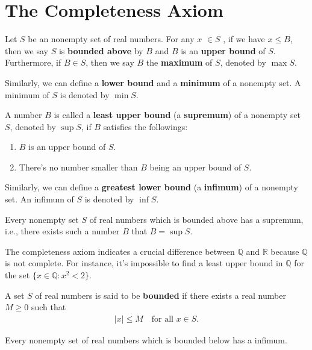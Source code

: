 	\section{The Completeness Axiom}
	\begin{definitionenv}\label{def_of_upb}
		Let $S$ be an nonempty set of real numbers. For any $x$ $\in S$ , if we have	$x\le B$, then we say $S$ is \textbf{bounded above} by $B$ and $B$ is an \textbf{upper bound} of $S$. Furthermore, if $B\in S$, then we say $B$ the \textbf{maximum} of $S$, denoted by $\max S$. 

        Similarly, we can define a \textbf{lower bound} and a \textbf{minimum} of a nonempty set. A minimum of $S$ is denoted by $\min S$.
	\end{definitionenv}
	\begin{definitionenv}
		A number $B$ is called a \textbf{least upper bound} (a \textbf{supremum}) of a nonempty set $S$, denoted by $\sup S$, if $B$ satisfies the followings:
		\begin{enumerate}
			\item $B$ is an upper bound of $S$.
			\item There's no number smaller than $B$ being an upper bound of $S$.
		\end{enumerate}
        Similarly, we can define a \textbf{greatest lower bound} (a \textbf{infimum}) of a nonempty set. An infimum of $S$ is denoted by $\inf S$.
	\end{definitionenv}
	\begin{axiomenv}
		Every nonempty set $S$ of real numbers which is bounded above has a supremum, i.e., there exists such a number $B$ that $B=\sup S$.
	\end{axiomenv}
	\begin{remarkenv}
		The completeness axiom indicates a crucial difference between $\mathbb{Q}$ and $\mathbb{R}$ because $\mathbb{Q}$ is not complete. For instance, it's impossible to find a least upper bound in $\mathbb{Q}$ for the set $\{ x\in \mathbb{Q}:x^2 < 2\}$.
	\end{remarkenv}
	\begin{definitionenv}
		A set $S$ of real numbers is said to be \textbf{bounded} if there exists a real number $M\ge 0$ such that
		\begin{align*}
			|x|\le M\quad \text{for all } x \in S.
		\end{align*}
	\end{definitionenv}
    \begin{theoremenv}
		Every nonempty set of real numbers which is bounded below has a infimum.
	\end{theoremenv}
